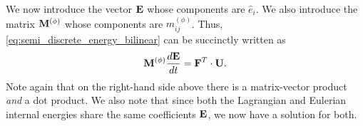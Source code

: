 \documentclass[11pt]{article}
\begin{document}
We now introduce the vector $\mathbf{E}$ whose components are $\hat{e}_i$. We also introduce the matrix $\mathbf{M}^{(\phi)}$ whose components are $m_{ij}^{(\phi)}$. Thus, \cref{eq:semi_discrete_energy_bilinear} can be succinctly written as
\begin{equation}
    \mathbf{M}^{(\phi)} \frac{d\mathbf{E}}{dt} = \mathbf{F}^T \cdot \mathbf{U}.
\end{equation}
Note again that on the right-hand side above there is a matrix-vector product \textit{and} a dot product. We also note that since both the Lagrangian and Eulerian internal energies share the same coefficients $\mathbf{E}$, we now have a solution for both.
\end{document}
